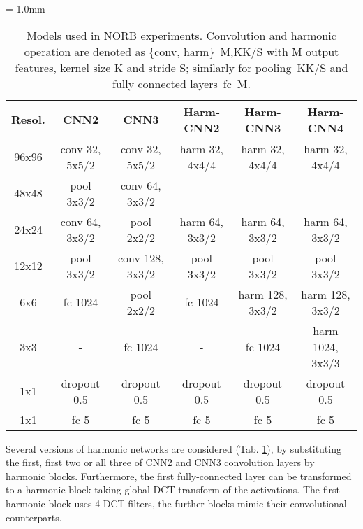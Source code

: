 \documentclass[12pt,a4paper]{article}
\begin{document}
\begin{table}[!t]
\tabcolsep = 1.0mm
\begin{center}
\caption{Models used in NORB experiments.
Convolution and harmonic operation are denoted as \{conv, harm\}~M,KK/S with M output features, kernel size K and stride S; similarly for pooling~KK/S and fully connected layers~fc~M.}
\vspace{0.3\baselineskip}
\label{tab:norb_nn}
\footnotesize
\begin{tabular}{cccccc}
\hline
\textbf{Resol.} & \textbf{CNN2} & \textbf{CNN3} & \textbf{Harm-CNN2}& \textbf{Harm-CNN3 }& \textbf{Harm-CNN4}\\
\hline
96x96 & conv 32, 5x5/2 & conv 32, 5x5/2 & harm 32, 4x4/4 & harm 32, 4x4/4 & harm 32, 4x4/4\\
48x48 & pool 3x3/2 & conv 64, 3x3/2 & - & - & - \\
24x24 & conv 64, 3x3/2 & pool 2x2/2 & harm 64, 3x3/2 & harm 64, 3x3/2& harm 64, 3x3/2 \\
12x12 & pool 3x3/2 & conv 128, 3x3/2 &  pool 3x3/2&pool 3x3/2&pool 3x3/2\\
6x6 & fc 1024 & pool 2x2/2 & fc 1024 & harm 128, 3x3/2 & harm 128, 3x3/2 \\
3x3 & - & fc 1024 & - & fc 1024 & harm 1024, 3x3/3 \\
1x1 & dropout 0.5 & dropout 0.5 & dropout 0.5& dropout 0.5& dropout 0.5\\
1x1 & fc 5 & fc 5 & fc 5& fc 5& fc 5\\
\hline
\end{tabular}
\end{center}
\end{table}

 Several versions of harmonic networks are considered (Tab. \ref{tab:norb_nn}), by substituting the first, first two or all three of CNN2 and CNN3 convolution layers by harmonic blocks. Furthermore, the first fully-connected layer can be transformed to a harmonic block taking global DCT transform of the activations. The first harmonic block uses 4 DCT filters, the further blocks mimic their convolutional counterparts.
\end{document}
